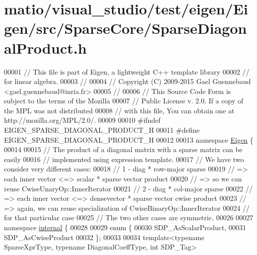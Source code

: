\hypertarget{matio_2visual__studio_2test_2eigen_2_eigen_2src_2_sparse_core_2_sparse_diagonal_product_8h_source}{}\section{matio/visual\+\_\+studio/test/eigen/\+Eigen/src/\+Sparse\+Core/\+Sparse\+Diagonal\+Product.h}
\label{matio_2visual__studio_2test_2eigen_2_eigen_2src_2_sparse_core_2_sparse_diagonal_product_8h_source}

\begin{DoxyCode}
00001 \textcolor{comment}{// This file is part of Eigen, a lightweight C++ template library}
00002 \textcolor{comment}{// for linear algebra.}
00003 \textcolor{comment}{//}
00004 \textcolor{comment}{// Copyright (C) 2009-2015 Gael Guennebaud <gael.guennebaud@inria.fr>}
00005 \textcolor{comment}{//}
00006 \textcolor{comment}{// This Source Code Form is subject to the terms of the Mozilla}
00007 \textcolor{comment}{// Public License v. 2.0. If a copy of the MPL was not distributed}
00008 \textcolor{comment}{// with this file, You can obtain one at http://mozilla.org/MPL/2.0/.}
00009 
00010 \textcolor{preprocessor}{#ifndef EIGEN\_SPARSE\_DIAGONAL\_PRODUCT\_H}
00011 \textcolor{preprocessor}{#define EIGEN\_SPARSE\_DIAGONAL\_PRODUCT\_H}
00012 
00013 \textcolor{keyword}{namespace }\hyperlink{namespace_eigen}{Eigen} \{ 
00014 
00015 \textcolor{comment}{// The product of a diagonal matrix with a sparse matrix can be easily}
00016 \textcolor{comment}{// implemented using expression template.}
00017 \textcolor{comment}{// We have two consider very different cases:}
00018 \textcolor{comment}{// 1 - diag * row-major sparse}
00019 \textcolor{comment}{//     => each inner vector <=> scalar * sparse vector product}
00020 \textcolor{comment}{//     => so we can reuse CwiseUnaryOp::InnerIterator}
00021 \textcolor{comment}{// 2 - diag * col-major sparse}
00022 \textcolor{comment}{//     => each inner vector <=> densevector * sparse vector cwise product}
00023 \textcolor{comment}{//     => again, we can reuse specialization of CwiseBinaryOp::InnerIterator}
00024 \textcolor{comment}{//        for that particular case}
00025 \textcolor{comment}{// The two other cases are symmetric.}
00026 
00027 \textcolor{keyword}{namespace }\hyperlink{namespaceinternal}{internal} \{
00028 
00029 \textcolor{keyword}{enum} \{
00030   SDP\_AsScalarProduct,
00031   SDP\_AsCwiseProduct
00032 \};
00033   
00034 \textcolor{keyword}{template}<\textcolor{keyword}{typename} SparseXprType, \textcolor{keyword}{typename} DiagonalCoeffType, \textcolor{keywordtype}{int} SDP\_Tag>

\end{DoxyCode}

